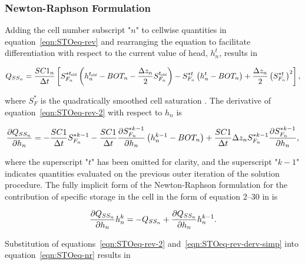 \subsubsection{Newton-Raphson Formulation}

Adding the cell number subscript "$n$" to cellwise quantities in equation~\ref{eqn:STOeq-rev} and rearranging the equation to facilitate differentiation with respect to the current value of head, $h_n^t$, results in

\begin{equation}
	\label{eqn:STOeq-rev-2}
	Q_{SS_n} = \frac{SC1_n}{\Delta t} \left[S_{F_n}^{\ast t_\mathit{\kern -0.07em old}} \left( h_n^{t_\mathit{\kern -0.07em old}} - BOT_n - \frac{\Delta z_n}{2} S_{F_n}^{t_\mathit{\kern -0.07em old}} \right) -S_{F_n}^{\ast t} \left( h_n^t - BOT_n \right) + \frac{\Delta z_n}{2} \left( S_{F_n}^{\ast t} \right)^2 \right] ,
\end{equation}

\noindent where $S_F^\ast$ is the quadratically smoothed cell saturation \citep[see][Eq.~4--5]{modflow6gwf}. The derivative of equation~\ref{eqn:STOeq-rev-2} with respect to $h_n$ is 

\begin{equation}
	\label{eqn:STOeq-rev-derv-simp}
	\frac{\partial Q_{SS_n}}{\partial h_n} = -\frac{SC1}{\Delta t} S_{F_n}^{\ast k-1} - \frac{SC1}{\Delta t} \frac{\partial S_{F_n}^{\ast k-1}}{\partial h_n} \left( h_n^{k-1} - BOT_n \right) + \frac{SC1}{\Delta t} \Delta z_n S_{F_n}^{\ast k-1}  \frac{\partial S_{F_n}^{\ast k-1}}{\partial h_n} ,
\end{equation}

\noindent where the superscript "$t$" has been omitted for clarity, and the superscript "$k-1$" indicates quantities evaluated on the previous outer iteration of the solution procedure. The fully implicit form of the Newton-Raphson formulation for the contribution of specific storage in the cell in the form of equation 2--30 in \cite{modflow6gwf} is

\begin{equation}
	\label{eqn:STOeq-nr}
	\frac{\partial Q_{SS_n}}{\partial h_n} h_n^k = -Q_{SS_n} + \frac{\partial Q_{SS_n}}{\partial h_n} h_n^{k-1} .
\end{equation}

\noindent Substitution of equations~\ref{eqn:STOeq-rev-2} and~\ref{eqn:STOeq-rev-derv-simp} into equation~\ref{eqn:STOeq-nr}  results in

